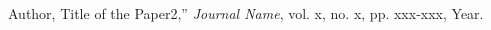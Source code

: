 \begin{thebibliography}{99}
Author, Title of the Paper2,'' \emph{Journal Name}, vol. x, no. x, pp. xxx-xxx, Year.

\end{thebibliography}
